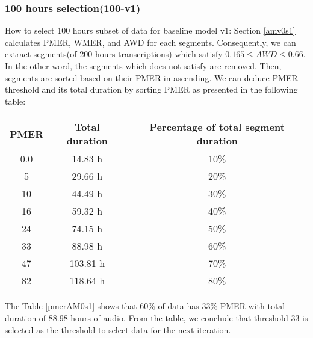 \subsubsection{100 hours selection(100-v1)}
How to select 100 hours subset of data for baseline model v1:
Section \ref{amv0s1}  calculates PMER, WMER, and AWD for each segments. Consequently, we can extract segments(of 200 hours transcriptions) which satisfy $0.165 \le AWD \le 0.66$. In the other word, the segments which does not satisfy are removed. Then, segments are sorted based on their PMER in ascending. We can deduce PMER threshold  and its total duration by sorting PMER as presented in the following table:  
\begin{center}
\label{pmerAM0s1}
\begin{tabular}{ | c | c | c | }
\hline
\textbf{PMER} & \textbf{Total duration} & \textbf{Percentage of total segment duration}  \\ \hline \hline
0.0 & 14.83 h & 10\% \\ \hline
5 & 29.66 h & 20\% \\ \hline
10 & 44.49 h & 30\% \\ \hline
16 & 59.32 h & 40\% \\ \hline
24 &  74.15 h & 50\% \\ \hline
33 & 88.98 h & 60\% \\ \hline
47 & 103.81 h & 70\% \\ \hline
82 & 118.64 h & 80\% \\ \hline
\end{tabular}
\end{center}



The Table \ref{pmerAM0s1} shows that 60\% of data has 33\% PMER with total duration of 88.98 hours of audio. From the table, we conclude that threshold 33 is selected as the threshold to select data for the next iteration.

